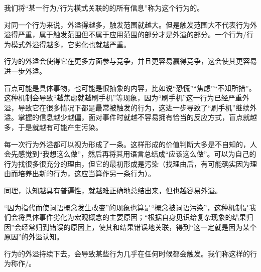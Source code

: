 \noindent 我们将“某一行为/行为模式关联的的所有信息”称为这个行为的。
\begin{examples}
对同一个行为来说，外溢得越多，触发范围就越大。但是触发范围大不代表行为外溢得严重，属于触发范围但不属于应用范围的部分才是外溢的部分。一个行为/行为模式外溢得越多，它劣化也就越严重。
\end{examples}
行为的外溢会使得它在更多方面参与竞争，并且更容易赢得竞争，这会使其更容易进一步外溢。
\begin{examples}
盲点可能是具体事物，也可能是很抽象的内容，比如说“恐慌”“焦虑”“不知所措”。这种机制会导致“越焦虑就越刷手机”等现象，因为“刷手机”这一行为已经严重外溢，导致它在很多情况下都是最常被触发的行为，这进一步导致了“刷手机”继续外溢。掌握的信息越少越偏，面对事件时就越不容易拥有恰当的反应方式，盲点就越多，于是就越有可能产生污染。

每一次行为外溢都可以视为形成了一条。这样形成的价值判断大多是不自知的，人会先感觉到“我想这么做”，然后再将其用语言总结成“应该这么做”。可以为自己的行为找很多很充分的理由，但它的最初形成是污染（找理由后，有可能确实因为理由而培养出新的行为，这应当算作另一条行为）。
\end{examples}
同理，认知越具有普遍性，就越难正确地总结出来，但也越容易外溢。
\begin{examples}
“因为指代而使词语概念发生改变”的现象也算是“概念被词语污染”，这种机制是我们会将具体事件劣化为宏观概念的主要原因；“根据自身见识给复杂现象的结果归因”会经常归到错误的原因上，使其和结果错误地关联，得到“这一定就是因为某个原因”的外溢认知。
\end{examples}
行为的外溢持续下去，会导致某些行为几乎在任何时候都会触发。我们称这样的行为称作/。
